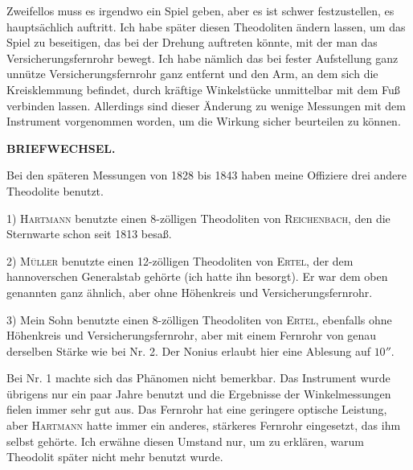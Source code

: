 \par\noindent\hspace*{\parindent}Zweifellos muss es irgendwo ein Spiel geben, aber es ist schwer festzustellen,  es hauptsächlich auftritt. Ich habe später diesen Theodoliten ändern lassen, um das Spiel zu beseitigen, das bei der Drehung auftreten könnte, mit der man das Versicherungsfernrohr bewegt. Ich habe nämlich das bei fester Aufstellung ganz unnütze Versicherungsfernrohr ganz entfernt und den Arm, an dem sich die Kreisklemmung befindet, durch kräftige Winkelstücke unmittelbar mit dem Fuß verbinden lassen. Allerdings sind  dieser Änderung zu wenige Messungen mit dem Instrument vorgenommen worden, um die Wirkung sicher beurteilen zu können.

\par\clearpage
\noindent{}\hfill{\small\textbf{BRIEFWECHSEL.}}\hfill\null\par\medskip
\par\noindent\hspace*{\parindent}Bei den späteren Messungen von 1828 bis 1843 haben meine Offiziere drei andere Theodolite benutzt.
\par\noindent\hspace*{\parindent}1) \textsc{Hartmann} benutzte einen 8-zölligen Theodoliten von \textsc{Reichenbach}, den die Sternwarte schon seit 1813 besaß.
\par\noindent\hspace*{\parindent}2) \textsc{Müller} benutzte einen 12-zölligen Theodoliten von \textsc{Ertel}, der dem hannoverschen Generalstab gehörte (ich hatte ihn besorgt). Er war dem oben genannten ganz ähnlich, aber ohne Höhenkreis und Versicherungsfernrohr.
\par\noindent\hspace*{\parindent}3) Mein Sohn benutzte einen 8-zölligen Theodoliten von \textsc{Ertel}, ebenfalls ohne Höhenkreis und Versicherungsfernrohr, aber mit einem Fernrohr von genau derselben Stärke wie bei Nr. 2. Der Nonius erlaubt hier eine Ablesung auf $10''$.

\par\noindent\hspace*{\parindent}Bei Nr. 1 machte sich das Phänomen nicht bemerkbar. Das Instrument wurde übrigens nur ein paar Jahre benutzt und die Ergebnisse der Winkelmessungen fielen immer sehr gut aus. Das Fernrohr hat eine geringere optische Leistung, aber \textsc{Hartmann} hatte immer ein anderes, stärkeres Fernrohr eingesetzt, das ihm selbst gehörte. Ich erwähne diesen Umstand nur, um zu erklären, warum  Theodolit später nicht mehr benutzt wurde.

